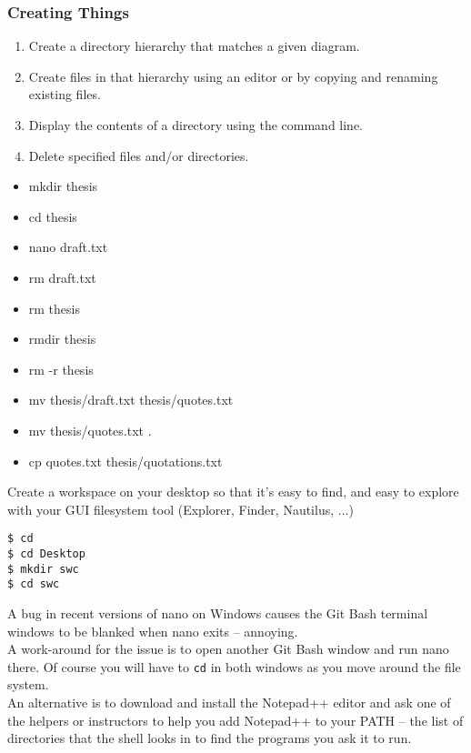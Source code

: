 \documentclass[xcolor=dvipsnames]{beamer}
\begin{document}
\begin{frame}[label=CreatingThings]
\frametitle{Creating Things}
\begin{enumerate}
\item    Create a directory hierarchy that matches a given diagram.
\item    Create files in that hierarchy using an editor or by copying and renaming existing files.
\item    Display the contents of a directory using the command line.
\item    Delete specified files and/or directories.
\end{enumerate}
\begin{multicols}{2}
\begin{itemize}
\item mkdir thesis
\item cd thesis
\item nano draft.txt
\item rm draft.txt
\item rm thesis
\item rmdir thesis
\item rm -r thesis
\item mv thesis/draft.txt thesis/quotes.txt
\item mv thesis/quotes.txt .
\item cp quotes.txt thesis/quotations.txt
\end{itemize}
\end{multicols}
\end{frame}


\begin{frame}[fragile]
Create a workspace on your desktop so that it's easy to find,
and easy to explore with your GUI filesystem tool
(Explorer, Finder, Nautilus, ...)
\begin{verbatim}
$ cd
$ cd Desktop
$ mkdir swc
$ cd swc
\end{verbatim}
\end{frame}


\begin{frame}
A bug in recent versions of nano on Windows causes the Git Bash terminal windows to be blanked when nano exits -- annoying.\\[20pt]

A work-around for the issue is to open another Git Bash window and run nano there.
Of course you will have to {\tt cd} in both windows as you move around the file system.\\[20pt]

An alternative is to download and install the Notepad++ editor and ask one of the helpers or instructors to help you add Notepad++ to your PATH -- the list of directories that the shell looks in to find the programs you ask it to run.
\end{frame}
\end{document}
